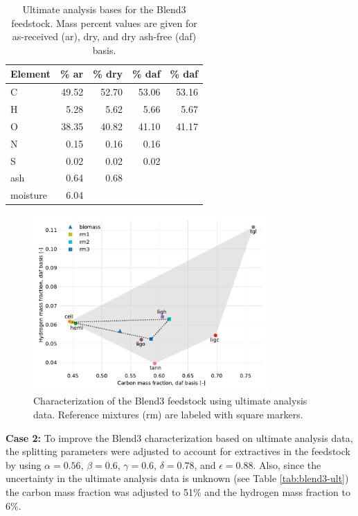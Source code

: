 \begin{table}[H]
    \centering
    \caption{Ultimate analysis bases for the Blend3 feedstock. Mass percent values are given for as-received (ar), dry, and dry ash-free (daf) basis.}
    \label{tab:blend3-ult-bases}
    \begin{tabular}{lrrrr}
        \toprule
        Element & \% ar & \% dry & \% daf & \% daf \\
        \midrule
        C        & 49.52 & 52.70 & 53.06 & 53.16 \\
        H        & 5.28  & 5.62  & 5.66  & 5.67  \\
        O        & 38.35 & 40.82 & 41.10 & 41.17 \\
        N        & 0.15  & 0.16  & 0.16  &       \\
        S        & 0.02  & 0.02  & 0.02  &       \\
        ash      & 0.64  & 0.68  &       &       \\
        moisture & 6.04  &       &       &       \\
        \bottomrule
    \end{tabular}
\end{table}

\begin{figure}[H]
    \centering
    \includegraphics[width=0.8\textwidth]{figures/blend3-biocharact-ult.pdf}
    \caption{Characterization of the Blend3 feedstock using ultimate analysis data. Reference mixtures (rm) are labeled with square markers.}
    \label{fig:blend3-biocharact-ult}
\end{figure}

\textbf{Case 2:} To improve the Blend3 characterization based on ultimate analysis data, the splitting parameters were adjusted to account for extractives in the feedstock by using $\alpha = 0.56$, $\beta = 0.6$, $\gamma = 0.6$, $\delta = 0.78$, and $\epsilon = 0.88$. Also, since the uncertainty in the ultimate analysis data is unknown (see Table \ref{tab:blend3-ult}) the carbon mass fraction was adjusted to 51\% and the hydrogen mass fraction to 6\%.

